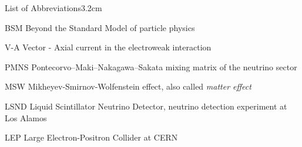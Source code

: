\begin{mclistof}{List of Abbreviations}{3.2cm}

\item[BSM] Beyond the Standard Model of particle physics
\item[V-A] Vector - Axial current in the electroweak interaction
\item[PMNS] Pontecorvo–Maki–Nakagawa–Sakata mixing matrix of the neutrino sector
\item[MSW] Mikheyev-Smirnov-Wolfenstein effect, also called \emph{matter effect}
\item[LSND] Liquid Scintillator Neutrino Detector, neutrino detection experiment at Los Alamos
\item[LEP] Large Electron-Positron Collider at CERN

\end{mclistof} 
